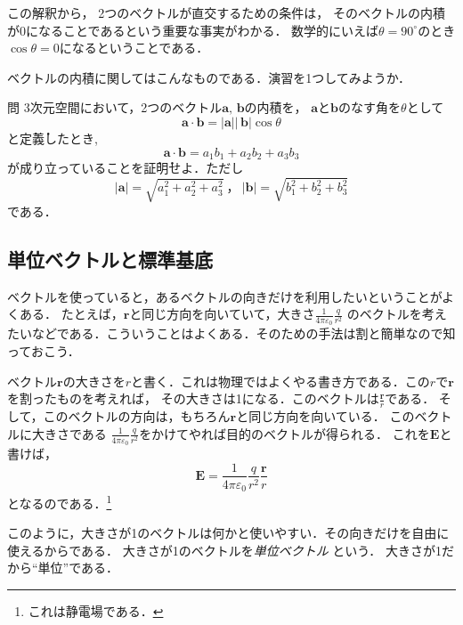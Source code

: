 この解釈から，
2つのベクトルが直交するための条件は，
そのベクトルの内積が0になることであるという重要な事実がわかる．
数学的にいえば$\theta = 90^\circ$のとき$\cos \theta = 0$になるということである．

ベクトルの内積に関してはこんなものである．演習を1つしてみようか．
\begin{itembox}[l]{問}
3次元空間において，2つのベクトル$\bm{a}, \, \bm{b}$の内積を，
$\bm{a}$と$\bm{b}$のなす角を$\theta$として
$$
\bm{a} \cdot  \bm{b} = \lvert \bm{a} \rvert \lvert \, \bm{b} \rvert \cos \theta
$$
と\.定\.義したとき,
$$
\bm{a} \cdot \bm{b} = a_1 b_1 +a_2 b_2 + a_3 b_3
$$
が成り立っていることを\.証\.明せよ．ただし
$$
\lvert \bm{a} \rvert = \sqrt{a_1^2 + a_2^2 + a_3^2} \ ，\ \lvert \bm{b} \rvert = \sqrt{b_1^2 + b_2^2 + b_3 ^2}
$$
である．
\end{itembox}
\subsection{単位ベクトルと標準基底}
ベクトルを使っていると，あるベクトルの向きだけを利用したいということがよくある．
たとえば，$\bm{r}$と同じ方向を向いていて，大きさ$\displaystyle \frac{1}{4 \pi \varepsilon_0} \frac{q}{r^2}$
のベクトルを考えたいなどである．こういうことはよくある．そのための手法は割と簡単なので知っておこう．

ベクトル$\bm{r}$の大きさを$r$と書く．これは物理ではよくやる書き方である．この$r$で$\bm{r}$を割ったものを考えれば，
その大きさは1になる．このベクトルは$\displaystyle \frac{\bm{r}}{r}$である．
そして，このベクトルの方向は，もちろん$\bm{r}$と同じ方向を向いている．
このベクトルに大きさである
$\displaystyle \frac{1}{4 \pi \varepsilon_0} \frac{q}{r^2}$をかけてやれば目的のベクトルが得られる．
これを$\bm{E}$と書けば，
$$
\bm{E} = \frac{1}{4 \pi \varepsilon_0} \frac{q}{r^2} \frac{\bm{r}}{r} 
$$
となるのである．\footnote{これは静電場である．}

このように，大きさが1のベクトルは何かと使いやすい．その向きだけを自由に使えるからである．
大きさが1のベクトルを\emph{単位ベクトル}
という．
大きさが1だから``単位''である．

